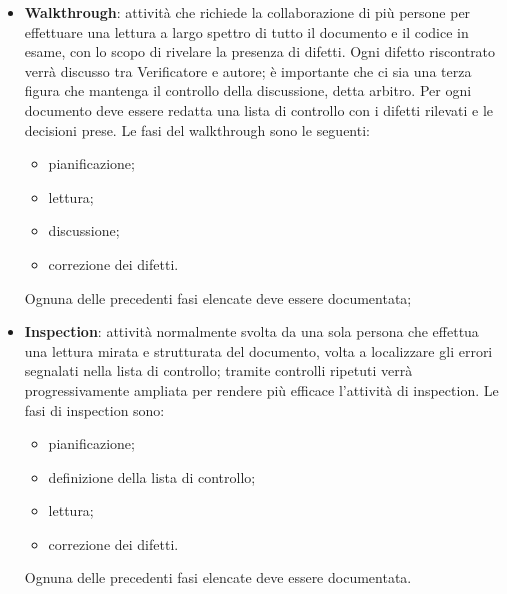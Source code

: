                 \begin{itemize}

                    \item \textbf{Walkthrough}:
                        attività che richiede la collaborazione di più persone per effettuare una lettura a largo
                        spettro di tutto il documento e il codice in esame, con lo scopo di rivelare la presenza
                        di difetti.
                        Ogni difetto riscontrato verrà discusso tra Verificatore e autore; è importante che ci
                        sia una terza figura che mantenga il controllo della discussione, detta arbitro.
                        Per ogni documento deve essere redatta una lista di controllo con i difetti rilevati e le
                        decisioni prese.
                        Le fasi del walkthrough sono le seguenti:

                            \begin{itemize}
                                \item pianificazione;
                                \item lettura;
                                \item discussione;
                                \item correzione dei difetti.
                            \end{itemize}

                        Ognuna delle precedenti fasi elencate deve essere documentata;

                    \item \textbf{Inspection}:
                        attività normalmente svolta da una sola persona che effettua una lettura mirata e
                        strutturata del documento, volta a localizzare gli errori segnalati nella lista
                        di controllo; tramite controlli ripetuti verrà progressivamente
                        ampliata per rendere più efficace l'attività di inspection.
                        Le fasi di inspection sono:

                            \begin{itemize}
                                \item pianificazione;
                                \item definizione della lista di controllo;
                                \item lettura;
                                \item correzione dei difetti.
                            \end{itemize}

                        Ognuna delle precedenti fasi elencate deve essere documentata.

                \end{itemize}

